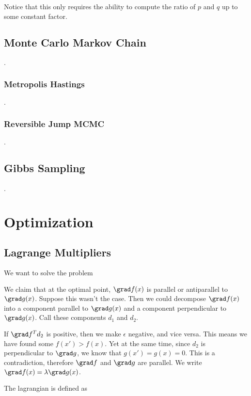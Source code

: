 \documentclass[12pt]{article}
\begin{document}
Notice that this only requires the ability to compute the ratio of $p$ and $q$ up to some constant factor.
\fi

\subsection{Monte Carlo Markov Chain}
.
\subsubsection{Metropolis Hastings}
.
\subsubsection{Reversible Jump MCMC}
.
\subsection{Gibbs Sampling}
.
\section{Optimization}

\subsection{Lagrange Multipliers}

We want to solve the problem


We claim that at the optimal point, $\grad f(x)$ is parallel or antiparallel to $\grad g(x)$. Suppose this wasn't the case. Then we could decompose $\grad f(x)$ into a component parallel to $\grad g(x)$ and a component perpendicular to $\grad g(x)$. Call these components $d_1$ and $d_2$. 


If $\grad f ^T d_2$ is positive, then we make $\epsilon$ negative, and vice versa. This means we have found some $f(x') > f(x)$. Yet at the same time, since $d_2$ is perpendicular to $\grad g$, we know that $g(x') = g(x) = 0$. This is a contradiction, therefore $\grad f$ and $\grad g$ are parallel. We write $\grad f(x) = \lambda \grad g(x)$.

The lagrangian is defined as

\end{document}

